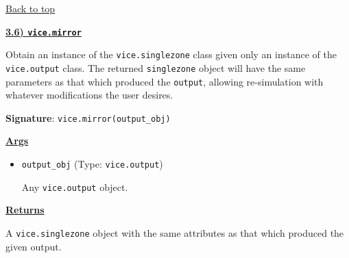 \documentclass{report}
\begin{document}
\vfill 
\hyperlink{top}{Back to top} 
\clearpage 

\newpage 
\noindent
\begin{center}
\hypertarget{func:mirror}{
	\underline{\LARGE
		\textbf{3.6) \texttt{vice.mirror}}
	}
}
\end{center}
\par\null\par\noindent
Obtain an instance of the \texttt{vice.singlezone} class given only an 
instance of the \texttt{vice.output} class. The returned \texttt{singlezone} 
object will have the same parameters as that which produced the \texttt{output}, 
allowing re-simulation with whatever modifications the user desires. 
\par\null\par\noindent 
\textbf{Signature}: \texttt{vice.mirror(output\_obj)} 
\par\null\par\noindent
\underline{\textbf{Args}}
\par\noindent
\begin{itemize}
	\item{
		\texttt{output\_obj} (Type: \texttt{vice.output}) 
		\par
		Any \texttt{vice.output} object. 
	}
\end{itemize}
\par\null\par\noindent
\underline{\textbf{Returns}}
\par\noindent 
A \texttt{vice.singlezone} object with the same attributes as that which 
produced the given output. 
\end{document}
